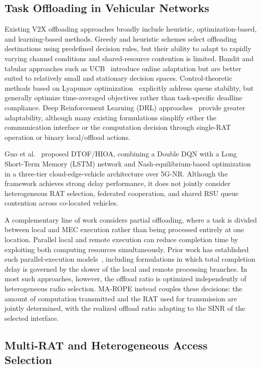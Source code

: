 \documentclass[journal,10pt,twocolumn]{IEEEtran}
\begin{document}
\subsection{Task Offloading in Vehicular Networks}

Existing V2X offloading approaches broadly include heuristic, optimization-based, and learning-based methods. Greedy and heuristic schemes select offloading destinations using predefined decision rules, but their ability to adapt to rapidly varying channel conditions and shared-resource contention is limited. Bandit and tabular approaches such as UCB~\cite{wu2021} introduce online adaptation but are better suited to relatively small and stationary decision spaces. Control-theoretic methods based on Lyapunov optimization~\cite{jing2019} explicitly address queue stability, but generally optimize time-averaged objectives rather than task-specific deadline compliance. Deep Reinforcement Learning (DRL) approaches~\cite{jing2019,yun2022,lowe2017} provide greater adaptability, although many existing formulations simplify either the communication interface or the computation decision through single-RAT operation or binary local/offload actions.

Guo et al.~\cite{guo2026} proposed DTOF/HIOA, combining a Double DQN with a Long Short-Term Memory (LSTM) network and Nash-equilibrium-based optimization in a three-tier cloud-edge-vehicle architecture over 5G-NR. Although the framework achieves strong delay performance, it does not jointly consider heterogeneous RAT selection, federated cooperation, and shared RSU queue contention across co-located vehicles.

A complementary line of work considers partial offloading, where a task is divided between local and MEC execution rather than being processed entirely at one location. Parallel local and remote execution can reduce completion time by exploiting both computing resources simultaneously. Prior work has established such parallel-execution models~\cite{mao2017}, including formulations in which total completion delay is governed by the slower of the local and remote processing branches. In most such approaches, however, the offload ratio is optimized independently of heterogeneous radio selection. MA-ROPE instead couples these decisions: the amount of computation transmitted and the RAT used for transmission are jointly determined, with the realized offload ratio adapting to the SINR of the selected interface.

\subsection{Multi-RAT and Heterogeneous Access Selection}
\end{document}
